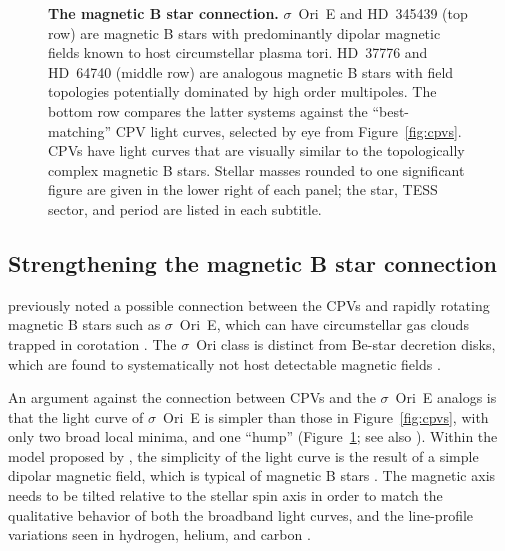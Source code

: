 \documentclass[11pt,twocolumn,tighten]{aastex63}
\begin{document}
\begin{figure}[!th]
	\begin{center}
		\centering
			
		\vspace{-0.34cm}

		\vspace{-0.34cm}

		\vspace{-0.1cm}
		\caption{
      {\bf The magnetic B star connection.}
      $\sigma$~Ori~E and HD~345439 (top row) are magnetic B stars with
      predominantly dipolar magnetic fields known to host
      circumstellar plasma tori.  HD~37776 and HD~64740 (middle row)
      are analogous magnetic B stars with field topologies potentially
      dominated by high order multipoles.  The bottom row compares the
      latter systems against the ``best-matching'' CPV light curves,
      selected by eye from Figure~\ref{fig:cpvs}.  CPVs have light
      curves that are visually similar to the topologically complex
      magnetic B stars.  Stellar masses rounded to one significant
      figure are given in the lower right of each panel; the star,
      TESS sector, and period are listed in each subtitle.
		}
		\label{fig:bstar}
	\end{center}
\end{figure}


\subsection{Strengthening the magnetic B star connection}
\label{subsec:bstardisc}

\citet{2017AJ....153..152S} previously noted a possible connection
between the CPVs and rapidly rotating magnetic B stars such as
$\sigma$~Ori~E, which can have circumstellar gas clouds trapped in
corotation \citep{2005ApJ...630L..81T}.  The $\sigma$~Ori class is
distinct from Be-star decretion disks, which are found to
systematically not host detectable magnetic fields
\citep{2013A&ARv..21...69R,2016ASPC..506..207W}.

An argument against the connection between CPVs and the $\sigma$~Ori~E
analogs is that the light curve of $\sigma$~Ori~E is simpler than
those in Figure~\ref{fig:cpvs}, with only two broad local minima, and
one ``hump'' (Figure~\ref{fig:bstar}; see also
\citealt{2022ApJ...924L..10J}).  Within the model proposed by
\citeauthor{2005ApJ...630L..81T}, the simplicity of the light curve is
the result of a simple dipolar magnetic field, which is typical of
magnetic B stars \citep{2007A&A...475.1053A,2009ARA&A..47..333D}.  The
magnetic axis needs to be tilted relative to the stellar spin axis in
order to match the qualitative behavior of both the broadband light
curves, and the line-profile variations seen in hydrogen, helium, and
carbon \citep{2012MNRAS.419..959O}.
\end{document}
